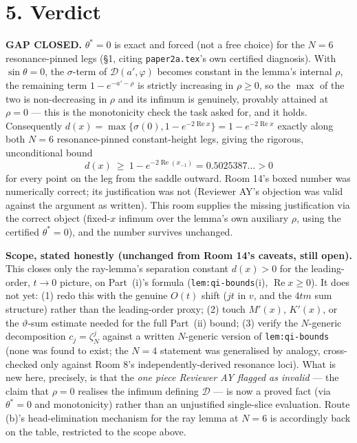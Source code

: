 \documentclass[11pt]{article}
\begin{document}
\section*{5. Verdict}

\textbf{GAP CLOSED.} $\theta^\ast=0$ is exact and forced (not a free choice) for the $N=6$
resonance-pinned legs (\S1, citing \texttt{paper2a.tex}'s own certified diagnosis). With
$\sin\theta=0$, the $\sigma$-term of $\mathcal D(a',\varphi)$ becomes constant in the lemma's
internal $\rho$, the remaining term $1-e^{-a'-\rho}$ is strictly increasing in $\rho\ge0$, so the
$\max$ of the two is non-decreasing in $\rho$ and its infimum is genuinely, provably attained at
$\rho=0$ --- this is the monotonicity check the task asked for, and it holds. Consequently
$d(x)=\max\{\sigma(0),1-e^{-2\operatorname{Re}x}\}=1-e^{-2\operatorname{Re}x}$ exactly along both
$N=6$ resonance-pinned constant-height legs, giving the rigorous, unconditional bound
\[
d(x)\ \ge\ 1-e^{-2\operatorname{Re}(x_{-1})}=0.5025387\ldots>0
\]
for every point on the leg from the saddle outward. Room 14's boxed number was numerically correct;
its justification was not (Reviewer AY's objection was valid against the argument as written). This
room supplies the missing justification via the correct object (fixed-$x$ infimum over the lemma's
own auxiliary $\rho$, using the certified $\theta^\ast=0$), and the number survives unchanged.

\textbf{Scope, stated honestly (unchanged from Room 14's caveats, still open).} This closes only the
ray-lemma's separation constant $d(x)>0$ for the leading-order, $t\to0$ picture, on Part~(i)'s
formula (\texttt{lem:qi-bounds}(i), $\operatorname{Re}x\ge0$). It does not yet: (1) redo this with
the genuine $O(t)$ shift ($jt$ in $v$, and the $4tm$ sum structure) rather than the leading-order
proxy; (2) touch $M'(x)$, $K'(x)$, or the $\vartheta$-sum estimate needed for the full Part~(ii)
bound; (3) verify the $N$-generic decomposition $c_j=\zeta_N^j$ against a written $N$-generic
version of \texttt{lem:qi-bounds} (none was found to exist; the $N=4$ statement was generalised by
analogy, cross-checked only against Room 8's independently-derived resonance loci). What is new
here, precisely, is that the \emph{one piece Reviewer AY flagged as invalid} --- the claim that
$\rho=0$ realises the infimum defining $\mathcal D$ --- is now a proved fact (via $\theta^\ast=0$
and monotonicity) rather than an unjustified single-slice evaluation. Route (b)'s head-elimination
mechanism for the ray lemma at $N=6$ is accordingly back on the table, restricted to the scope above.
\end{document}
